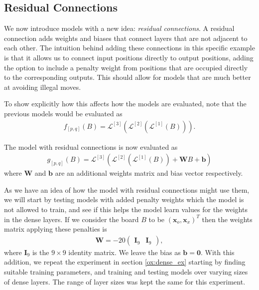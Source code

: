\documentclass{somasmsc}
\begin{document}
\subsection{Residual Connections}

We now introduce models with a new idea: \textit{residual connections}. A residual connection adds weights and biases that connect layers that are not adjacent to each other. The intuition behind adding these connections in this specific example is that it allows us to connect input positions directly to output positions, adding the option to include a penalty weight from positions that are occupied directly to the corresponding outputs. This should allow for models that are much better at avoiding illegal moves.

To show explicitly how this affects how the models are evaluated, note that the previous models would be evaluated as
\begin{align*}
    f_{\left[p,q\right]}\left(B\right) = \mathcal{L}^{\left[3\right]}\left( \mathcal{L}^{\left[2\right]}\left( \mathcal{L}^{\left[1\right]}\left(B\right)\right)\right).
\end{align*}

The model with residual connections is now evaluated as
\begin{align*}
    g_{\left[p,q\right]}\left(B\right) = \mathcal{L}^{\left[3\right]}\left( \mathcal{L}^{\left[2\right]}\left( \mathcal{L}^{\left[1\right]}\left(B\right)\right) + \mathbf{W}B + \pmb{b}\right)
\end{align*}
where $\mathbf{W}$ and $\pmb{b}$ are an additional weights matrix and bias vector respectively.

As we have an idea of how the model with residual connections might use them, we will start by testing models with added penalty weights which the model is not allowed to train, and see if this helps the model learn values for the weights in the dense layers. If we consider the board $B$ to be $\left(\pmb{x}_o, \pmb{x}_x\right)^T$ then the weights matrix applying these penalties is
\begin{align*}
    \mathbf{W} = -20
    \begin{pmatrix}
        \mathbf{I}_{9} & \mathbf{I}_{9}
    \end{pmatrix},
\end{align*}
where $\mathbf{I}_9$ is the $9 \times 9$ identity matrix. We leave the bias as $\pmb{b} = \mathbf{0}$. With this addition, we repeat the experiment in section \ref{ox:dense_ex} starting by finding suitable training parameters, and training and testing models over varying sizes of dense layers. The range of layer sizes was kept the same for this experiment.
\end{document}

